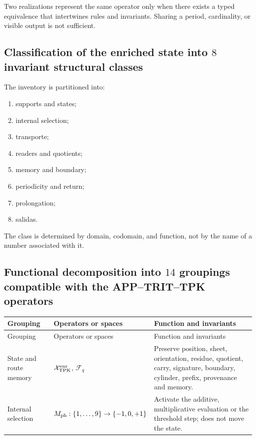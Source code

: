 {Two realizations represent the same operator only when there exists a
typed equivalence that intertwines rules and invariants. Sharing a period,
cardinality, or visible output is not sufficient.

\subsection{Classification of the enriched state into \(8\) invariant structural classes}

The inventory is partitioned into:
\begin{enumerate}
 \item[\textbf{C1.}] supports and states;
 \item[\textbf{C2.}] internal selection;
 \item[\textbf{C3.}] transporte;
 \item[\textbf{C4.}] readers and quotients;
 \item[\textbf{C5.}] memory and boundary;
 \item[\textbf{C6.}] periodicity and return;
 \item[\textbf{C7.}] prolongation;
 \item[\textbf{C8.}] salidas.
\end{enumerate}
The class is determined by domain, codomain, and function, not by the name of a number associated with it.

\Needspace{.92\textheight}
\subsection{Functional decomposition into \(14\) groupings compatible with the
APP–TRIT–TPK operators}

\begingroup
\small
\renewcommand{\arraystretch}{1.12}
\begin{longtable}{@{}>{\raggedright\arraybackslash}p{}>{\raggedright\arraybackslash}p{}>{\raggedright\arraybackslash}p{}@{}}
\toprule
Grouping&Operators or spaces&Function and invariants\\
\midrule
\endfirsthead
\toprule
Grouping&Operators or spaces&Function and invariants\\
\midrule
\endhead
State and route memory&
\(\mathcal X_{\rm TPK}^{\rm enr}\), \(\mathcal F_q\)&
Preserve position, sheet, orientation, residue, quotient, carry, signature,
boundary, cylinder, prefix, provenance and memory.\\

Internal selection&
\(M_{\rm ph}:\{1,\ldots,9\}\to\{-1,0,+1\}\)&
Activate the additive, multiplicative evaluation or the threshold step; does not move
the state.\\


\end{longtable}}
